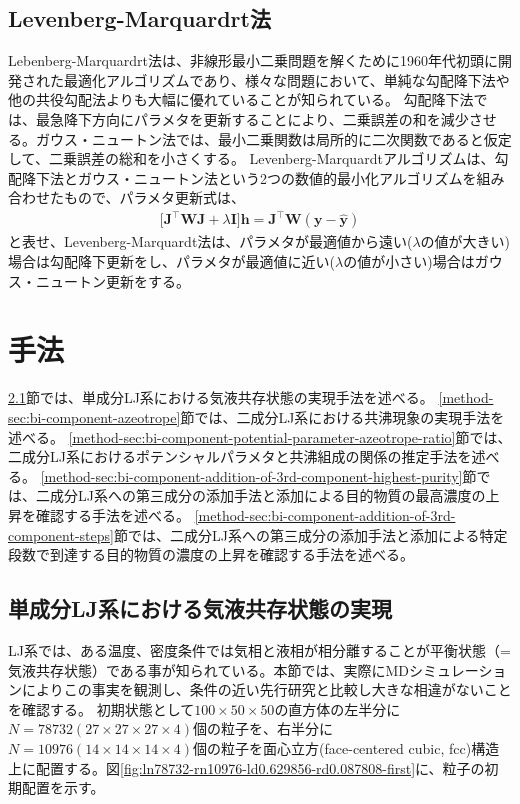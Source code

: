 \documentclass[titlepage]{jsreport}
\begin{document}
\section{Levenberg-Marquardrt法}\label{principle-sec:levenberg-marquardt}
Lebenberg-Marquardrt法は、非線形最小二乗問題を解くために1960年代初頭に開発された最適化アルゴリズムであり、様々な問題において、単純な勾配降下法や他の共役勾配法よりも大幅に優れていることが知られている\cite{levenberg-marquardt}。
勾配降下法では、最急降下方向にパラメタを更新することにより、二乗誤差の和を減少させる。ガウス・ニュートン法では、最小二乗関数は局所的に二次関数であると仮定して、二乗誤差の総和を小さくする。
Levenberg-Marquardtアルゴリズムは、勾配降下法とガウス・ニュートン法という2つの数値的最小化アルゴリズムを組み合わせたもので、パラメタ更新式は、
\large
\begin{eqnarray}
\Big[\bm{J}^\top\bm{W}\bm{J}+\lambda\bm{I}\Big]\bm{h} = \bm{J}^\top\bm{W}(\bm{y}-\bm{\hat{y}})
\end{eqnarray}
\normalsize
と表せ、Levenberg-Marquardt法は、パラメタが最適値から遠い($\lambda$の値が大きい)場合は勾配降下更新をし、パラメタが最適値に近い($\lambda$の値が小さい)場合はガウス・ニュートン更新をする\cite{gradient-descent_gauss-newton_levenberg-marquardt}。


\chapter{手法} \label{chap:method}
\ref{method-sec:mono-component}節では、単成分LJ系における気液共存状態の実現手法を述べる。
\ref{method-sec:bi-component-azeotrope}節では、二成分LJ系における共沸現象の実現手法を述べる。
\ref{method-sec:bi-component-potential-parameter-azeotrope-ratio}節では、二成分LJ系におけるポテンシャルパラメタと共沸組成の関係の推定手法を述べる。
\ref{method-sec:bi-component-addition-of-3rd-component-highest-purity}節では、二成分LJ系への第三成分の添加手法と添加による目的物質の最高濃度の上昇を確認する手法を述べる。
\ref{method-sec:bi-component-addition-of-3rd-component-steps}節では、二成分LJ系への第三成分の添加手法と添加による特定段数で到達する目的物質の濃度の上昇を確認する手法を述べる。


\section{単成分LJ系における気液共存状態の実現} \label{method-sec:mono-component}
LJ系では、ある温度、密度条件では気相と液相が相分離することが平衡状態（=気液共存状態）である事が知られている\cite{gas-liquid-equilibrium}。本節では、実際にMDシミュレーションによりこの事実を観測し、条件の近い先行研究と比較し大きな相違がないことを確認する。
初期状態として$100×50×50$の直方体の左半分に$N=78732(27×27×27×4)$個の粒子を、右半分に$N=10976(14×14×14×4)$個の粒子を面心立方(face-centered cubic, fcc)構造上に配置する。図\ref{fig:ln78732-rn10976-ld0.629856-rd0.087808-first}に、粒子の初期配置を示す。
\end{document}
